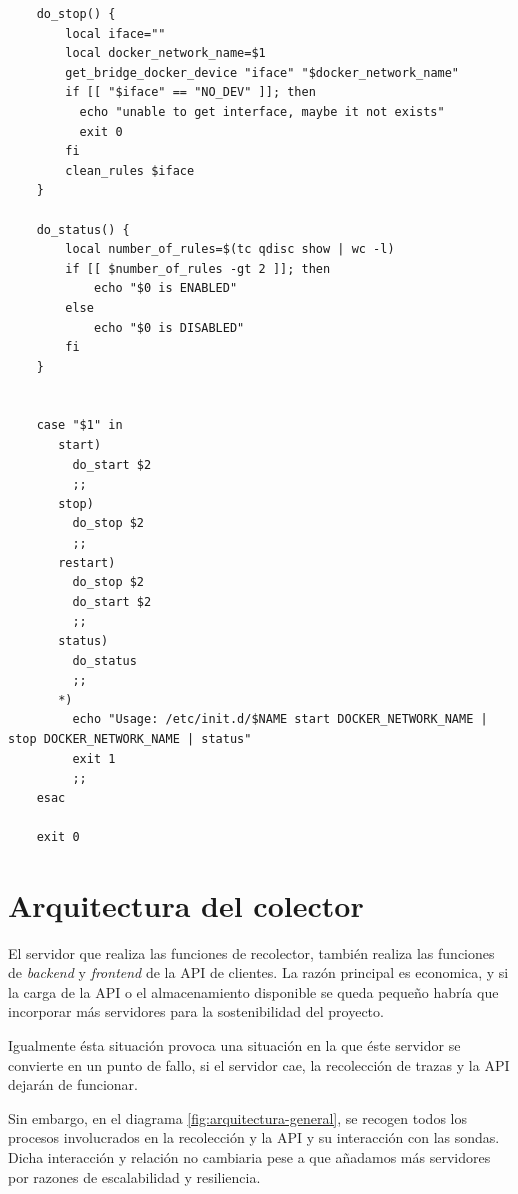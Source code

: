 \begin{verbatim}
    do_stop() {
        local iface=""
        local docker_network_name=$1
        get_bridge_docker_device "iface" "$docker_network_name"
        if [[ "$iface" == "NO_DEV" ]]; then
          echo "unable to get interface, maybe it not exists"
          exit 0
        fi
        clean_rules $iface
    }
    
    do_status() {
        local number_of_rules=$(tc qdisc show | wc -l)
        if [[ $number_of_rules -gt 2 ]]; then
            echo "$0 is ENABLED"
        else
            echo "$0 is DISABLED"
        fi
    }
    
    
    case "$1" in
       start)
         do_start $2
         ;;
       stop)
         do_stop $2
         ;;
       restart)
         do_stop $2
         do_start $2
         ;;
       status)
         do_status
         ;;
       *)
         echo "Usage: /etc/init.d/$NAME start DOCKER_NETWORK_NAME | stop DOCKER_NETWORK_NAME | status"
         exit 1
         ;;
    esac
    
    exit 0    
\end{verbatim}
\bigskip


\section{Arquitectura del colector}
\label{sec:arquitecura-del-colector}

El servidor que realiza las funciones de recolector, también realiza las funciones
de \emph{backend} y \emph{frontend} de la API de clientes. La razón principal
es economica, y si la carga de la API o el almacenamiento disponible se queda pequeño
habría que incorporar más servidores para la sostenibilidad del proyecto.

Igualmente ésta situación provoca una situación en la que éste servidor se convierte en un 
punto de fallo, si el servidor cae, la recolección de trazas y la API dejarán de funcionar.

Sin embargo, en el diagrama \ref{fig:arquitectura-general}, se recogen todos los procesos involucrados
en la recolección y la API y su interacción con las sondas. Dicha interacción y relación no cambiaria pese
a que añadamos más servidores por razones de escalabilidad y resiliencia.

